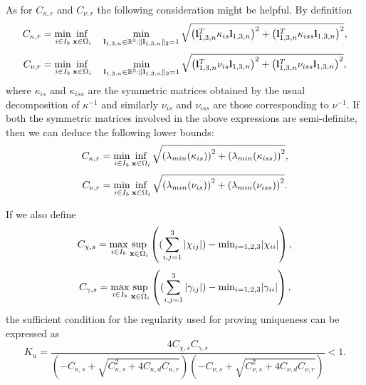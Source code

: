 As for $C_{\kappa, r}$ and $C_{\nu, r}$ the following consideration
might be helpful.
By definition
%
\begin{equation} \label{equation_for_C_kr_first}
  C_{\kappa, r} = 
    \min_{i \in I_b} \inf_{{\bf x} \in \Omega_i} \quad
    \min_{{\bf l}_{1,3,n} \in \mathbb{R}^3: \| {\bf l}_{1,3,n} \|_2 = 1} 
    \sqrt{\left(
            {\bf l}_{1,3,n}^T \kappa_{is} {\bf l}_{1,3,n}
          \right)^2 
          + 
          \left(
            {\bf l}_{1,3,n}^T \kappa_{iss} {\bf l}_{1,3,n}
          \right)^2},
\end{equation}
%
\begin{equation} \label{equation_for_C_nur_first}
  C_{\nu, r} = 
    \min_{i \in I_b} \inf_{{\bf x} \in \Omega_i} \quad
    \min_{{\bf l}_{1,3,n} \in \mathbb{R}^3: \| {\bf l}_{1,3,n} \|_2 = 1} 
    \sqrt{\left(
            {\bf l}_{1,3,n}^T \nu_{is} {\bf l}_{1,3,n}
          \right)^2 
          + 
          \left(
            {\bf l}_{1,3,n}^T \nu_{iss} {\bf l}_{1,3,n}
          \right)^2},
\end{equation}
%
where $\kappa_{is}$ and $\kappa_{iss}$ are the symmetric matrices 
obtained by the usual decomposition of $\kappa^{-1}$ and similarly 
$\nu_{is}$ and $\nu_{iss}$ are those corresponding to $\nu^{-1}$. 
If both the symmetric matrices involved in the above expressions are 
semi-definite, then we can deduce the following lower bounds:
%
\begin{equation} \label{equation_for_C_kr}
  C_{\kappa, r} = 
    \min_{i \in I_b} \inf_{{\bf x} \in \Omega_i}
    \sqrt{ \left( \lambda_{min}(\kappa_{is}) \right)^2 
           + 
           \left( \lambda_{min}(\kappa_{iss}) \right)^2},
\end{equation}
%
\begin{equation} \label{equation_for_C_nur}
  C_{\nu, r} = 
    \min_{i \in I_b} \inf_{{\bf x} \in \Omega_i}
    \sqrt{ \left( \lambda_{min}(\nu_{is}) \right)^2 
           + 
           \left( \lambda_{min}(\nu_{iss}) \right)^2}.
\end{equation}
%

If we also define
%
\begin{equation} \label{equation_for_C_chis}
  C_{\chi,s} = 
    \max_{i \in I_b} \sup_{{\bf x} \in \Omega_i} 
      \left((\sum_{i,j=1}^3|\chi_{ij}|)-\mathrm{min}_{i=1,2,3}|\chi_{ii}| \right),
\end{equation}
%
\begin{equation} \label{equation_for_C_gammas}
  C_{\gamma,s} = 
    \max_{i \in I_b} \sup_{{\bf x} \in \Omega_i} 
    \left((\sum_{i,j=1}^3|\gamma_{ij}|)-\mathrm{min}_{i=1,2,3}|\gamma_{ii}| \right),
\end{equation}
%
the sufficient condition for the regularity used for proving 
uniqueness can be expressed as
%
\begin{equation} \label{equation_for_Ku}
  K_{u} = 
  \frac{4 C_{\chi,s} C_{\gamma,s}}{
  \left( -C_{\kappa,s} + \sqrt{C_{\kappa,s}^2+4C_{\kappa,d}C_{\kappa,r}} \right)
  \left( -C_{\nu,s} + \sqrt{C_{\nu,s}^2+4C_{\nu,d}C_{\nu,r}} \right)} < 1.
\end{equation}
%
